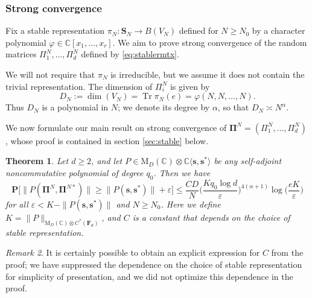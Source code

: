 \documentclass[10pt,reqno]{amsart}
\newtheorem{thm}{Theorem}[section]
\theoremstyle{definition}
\theoremstyle{remark}
\newtheorem{rem}[thm]{Remark}
\numberwithin{equation}{section}
\numberwithin{figure}{section}
\numberwithin{table}{section}
\newcommand{\tr}{\mathop{\mathrm{Tr}}}
\begin{document}
\subsubsection{Strong convergence}
\label{sec:stabmain}

Fix a stable representation $\pi_N:\mathbf{S}_N\to B(V_N)$ defined for 
$N\ge N_0$ by a character polynomial 
$\varphi\in\mathbb{C}[x_1,\ldots,x_r]$. We aim to prove strong convergence 
of the random matrices $\Pi^N_1,\ldots,\Pi^N_d$ defined by 
\eqref{eq:stablermtx}.

We will not require that $\pi_N$ is irreducible, but we assume it does
not contain the trivial representation.
The dimension of $\Pi_i^N$ is given by
$$
	D_N := \dim(V_N) = \tr \pi_N(e) = \varphi(N,N,\ldots,N).
$$
Thus $D_N$ is a polynomial in $N$; we denote its degree by $\alpha$,
so that $D_N\asymp N^\alpha$.

We now formulate our main result on strong convergence of 
$\boldsymbol{\Pi}^N=(\Pi^N_1,\ldots,\Pi^N_d)$, whose proof is contained
in section \ref{sec:stable} below. 

\begin{thm}
\label{thm:strongstable}
Let $d\ge 2$, and let $P\in \mathrm{M}_D(\mathbb{C})
\otimes \mathbb{C}\langle\boldsymbol{s},\boldsymbol{s}^*\rangle$ be any 
self-adjoint noncommutative polynomial of degree $q_0$. Then we have
$$
	\mathbf{P}\big[\|P(\boldsymbol{\Pi}^N,\boldsymbol{\Pi}^{N*})\|\ge
	\|P(\boldsymbol{s},\boldsymbol{s}^*)\|+\varepsilon\big]
	\le
	\frac{CD}{N}
	\bigg(\frac{K q_0\log d}{\varepsilon}\bigg)^{4(\alpha+1)}
	\log
	\bigg(\frac{eK}{\varepsilon}\bigg)
$$
for all $\varepsilon < K-\|P(\boldsymbol{s},\boldsymbol{s}^*)\|$ and
$N\ge N_0$. Here we define $K=\|P\|_{\mathrm{M}_D(\mathbb{C})\otimes 
C^*(\mathbf{F}_d)}$, and $C$ is a constant that depends on the choice of
stable representation.
\end{thm}

\begin{rem}
It is certainly possible to obtain an explicit expression for $C$ from 
the proof; we have suppressed the dependence on the choice of
stable representation for simplicity of presentation, and we did
not optimize this dependence in the proof.
\end{rem}
\end{document}

